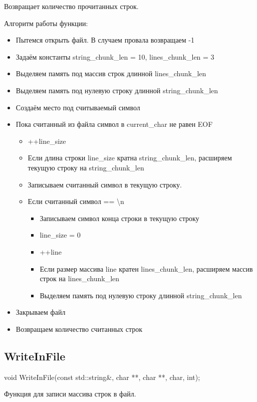 \documentclass[12pt,a4paper]{article}  %
\begin{document}
	Возвращает количество прочитанных строк.
	
	
	Алгоритм работы функции:
	
	\begin{itemize}
		\item Пытемся открыть файл. В случаем провала возвращаем -1
		\item Задаём константы string\_chunk\_len = 10, lines\_chunk\_len = 3
		\item Выделяем память под массив строк длинной lines\_chunk\_len
		\item Выделяем память под нулевую строку длинной string\_chunk\_len
		\item Создаём место под считываемый символ
		\item Пока считанный из файла символ в current\_char не равен EOF
		\begin{itemize}
			\item ++line\_size
			\item Если длина строки line\_size кратна string\_chunk\_len, расширяем текущую строку на string\_chunk\_len
			\item Записываем считанный символ в текущую строку.
			\item Если считанный символ == \textbackslash n
			\begin{itemize}
				\item Записываем символ конца строки в текущую строку
				\item line\_size = 0
				\item ++line
				\item Если размер массива line кратен lines\_chunk\_len, расширяем массив строк на lines\_chunk\_len
				\item Выделяем память под нулевую строку длинной string\_chunk\_len
			\end{itemize}
		\end{itemize}
		\item Закрываем файл
		\item Возвращаем количество считанных строк
	\end{itemize}
	
	\fi
	
	\subsection*{WriteInFile}
	void WriteInFile(const std::string\&, char **, char **, char, int);
	
	Функция для записи массива строк в файл.
	
\end{document}
